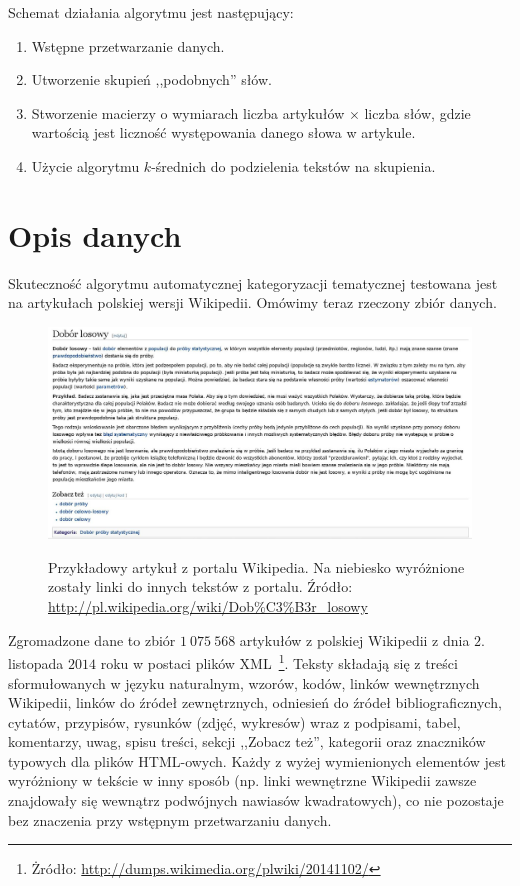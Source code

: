 \documentclass{praca1}
\begin{document}
Schemat działania algorytmu jest następujący:
\begin{enumerate}
\item Wstępne przetwarzanie danych.
\item Utworzenie skupień ,,podobnych'' słów.
\item Stworzenie macierzy o wymiarach liczba artykułów $\times$ liczba słów, gdzie wartością jest liczność występowania danego słowa w artykule.
\item Użycie algorytmu $k$-średnich do podzielenia tekstów na skupienia.
\end{enumerate}

\section{Opis danych}

Skuteczność algorytmu automatycznej kategoryzacji tematycznej testowana jest na artykułach polskiej wersji Wikipedii. Omówimy teraz rzeczony zbiór danych.

\begin{figure}[!h]
  \centering
  \includegraphics[width=450pt]{wiki2.jpg}\\
  \caption{Przykładowy artykuł z portalu Wikipedia. Na niebiesko wyróżnione zostały linki do innych tekstów z portalu. Źródło: \url{http://pl.wikipedia.org/wiki/Dob\%C3\%B3r\_losowy}}\label{wiki}
\end{figure}

Zgromadzone dane to zbiór $1\ 075\ 568$ artykułów z polskiej Wikipedii z dnia $2.$ listopada $2014$ roku w postaci plików XML~\footnote{Żródło: \url{http://dumps.wikimedia.org/plwiki/20141102/}}. Teksty składają się z treści sformułowanych w języku naturalnym, wzorów, kodów, linków wewnętrznych Wikipedii, linków do źródeł zewnętrznych, odniesień do źródeł bibliograficznych, cytatów, przypisów, rysunków (zdjęć, wykresów) wraz z podpisami, tabel, komentarzy, uwag, spisu treści, sekcji ,,Zobacz też'', kategorii oraz znaczników typowych dla plików HTML-owych. Każdy z wyżej wymienionych elementów jest wyróżniony w tekście w inny sposób (np. linki wewnętrzne Wikipedii zawsze znajdowały się wewnątrz podwójnych nawiasów kwadratowych), co nie pozostaje bez znaczenia przy wstępnym przetwarzaniu danych.
\end{document}
